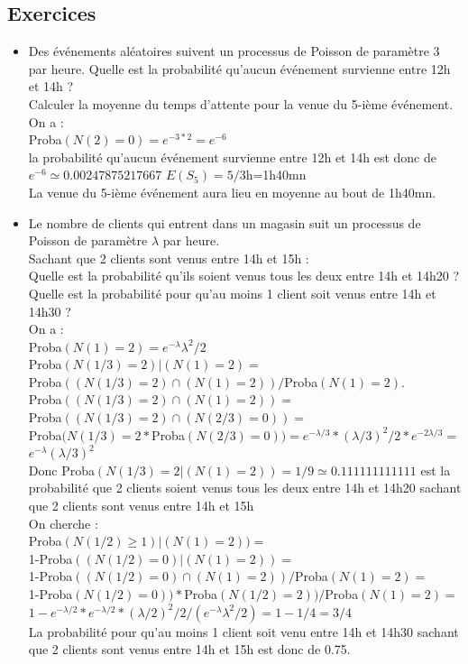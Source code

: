 \documentclass[a4paper,11pt]{book}
\begin{document}
\subsection{Exercices} 
\begin{itemize}
\item Des \'ev\'enements al\'eatoires suivent un processus de Poisson 
de param\`etre $3$ par heure. Quelle est la probabilit\'e qu'aucun \'ev\'enement
survienne entre 12h et 14h ?\\
Calculer la moyenne du temps d'attente pour la venue du 5-i\`eme 
\'ev\'enement.\\

On a :\\
Proba$(N(2)=0)=e^{-3*2}=e^{-6}$\\
la probabilit\'e qu'aucun \'ev\'enement survienne entre 12h et 14h est donc de
$e^{-6}\simeq 0.00247875217667$
$E(S_5)=5/3$h=1h40mn\\
La venue du 5-i\`eme \'ev\'enement aura lieu en moyenne au bout de 1h40mn. 

\item Le nombre de clients qui entrent dans un magasin suit un processus de 
Poisson de param\`etre $\lambda$ par heure.\\
Sachant que 2 clients sont venus entre 14h et 15h :\\
Quelle est la probabilit\'e qu'ils soient venus tous les deux entre 14h et 
14h20 ?\\
Quelle est la probabilit\'e pour qu'au moins 1 client soit venus entre 14h et
14h30 ?\\

On a :\\
Proba$(N(1)=2)=e^{-\lambda}\lambda^2/2$\\
Proba$(N(1/3)=2)|(N(1)=2)=$\\
Proba$((N(1/3)=2)\cap(N(1)=2))/$Proba$(N(1)=2)$.\\
Proba$((N(1/3)=2)\cap(N(1)=2))=$\\
Proba$((N(1/3)=2)\cap(N(2/3)=0))=$\\
Proba$(N(1/3)=2*$Proba$(N(2/3)=0))=e^{-\lambda/3}*(\lambda/3)^2/2*e^{-2\lambda/3}=
$\\
$e^{-\lambda}(\lambda/3)^2$ \\
Donc Proba$(N(1/3)=2|(N(1)=2))=1/9\simeq 0.111111111111$ est la probabilit\'e 
que 2 clients soient venus tous les deux entre 14h et 
14h20 sachant que 2 clients sont venus entre 14h et 15h\\
On cherche :\\
Proba$(N(1/2)\geq 1)|(N(1)=2))=$\\
1-Proba$((N(1/2)=0)|(N(1)=2))=$\\
1-Proba$((N(1/2)=0)\cap(N(1)=2))/$Proba$(N(1)=2)=$\\
1-Proba$(N(1/2)=0))*$Proba$(N(1/2)=2))/$Proba$(N(1)=2)=$\\
$1-e^{-\lambda/2}*e^{-\lambda/2}*(\lambda/2)^2/2/(e^{-\lambda}\lambda^2/2)=1-1/4=3/4$\\
La probabilit\'e pour qu'au moins 1 client soit venu entre 14h et
14h30 sachant que 2 clients sont venus entre 14h et 15h est donc de 0.75.
\end{itemize}                  
\end{document}
